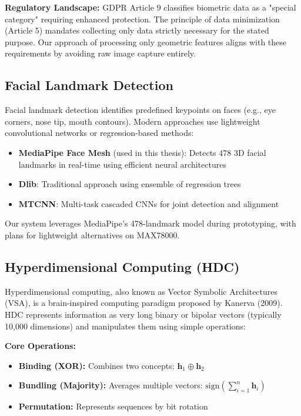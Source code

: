 \documentclass[a4paper,12pt]{article}
\begin{document}
\textbf{Regulatory Landscape:} GDPR Article 9 classifies biometric data as a "special category" requiring enhanced protection. The principle of data minimization (Article 5) mandates collecting only data strictly necessary for the stated purpose. Our approach of processing only geometric features aligns with these requirements by avoiding raw image capture entirely.

\subsection{Facial Landmark Detection}

Facial landmark detection identifies predefined keypoints on faces (e.g., eye corners, nose tip, mouth contours). Modern approaches use lightweight convolutional networks or regression-based methods:

\begin{itemize}
    \item \textbf{MediaPipe Face Mesh} (used in this thesis): Detects 478 3D facial landmarks in real-time using efficient neural architectures
    \item \textbf{Dlib}: Traditional approach using ensemble of regression trees
    \item \textbf{MTCNN}: Multi-task cascaded CNNs for joint detection and alignment
\end{itemize}

Our system leverages MediaPipe's 478-landmark model during prototyping, with plans for lightweight alternatives on MAX78000.

\subsection{Hyperdimensional Computing (HDC)}

Hyperdimensional computing, also known as Vector Symbolic Architectures (VSA), is a brain-inspired computing paradigm proposed by Kanerva (2009). HDC represents information as very long binary or bipolar vectors (typically 10,000 dimensions) and manipulates them using simple operations:

\textbf{Core Operations:}
\begin{itemize}
    \item \textbf{Binding (XOR):} Combines two concepts: $\mathbf{h}_1 \oplus \mathbf{h}_2$
    \item \textbf{Bundling (Majority):} Averages multiple vectors: $\text{sign}(\sum_{i=1}^n \mathbf{h}_i)$
    \item \textbf{Permutation:} Represents sequences by bit rotation
\end{itemize}
\end{document}
